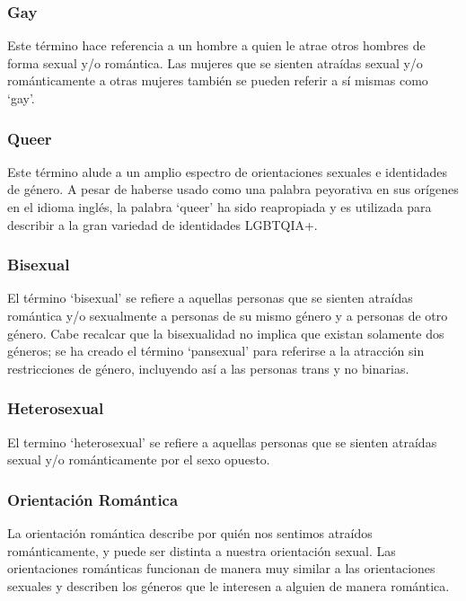 \documentclass[12pt,openany]{book}
\begin{document}
\subsubsection*{Gay}

Este término hace referencia a un hombre a quien le atrae otros hombres de forma sexual y/o romántica. Las mujeres que se sienten atraídas sexual y/o románticamente a otras mujeres también se pueden referir a sí mismas como `gay'.

\subsubsection*{Queer}

Este término alude a un amplio espectro de orientaciones sexuales e identidades de género. A pesar de haberse usado como una palabra peyorativa en sus orígenes en el idioma inglés, la palabra `queer' ha sido reapropiada y es utilizada para describir a la gran variedad de identidades LGBTQIA+.

\subsubsection*{Bisexual}

El término `bisexual' se refiere a aquellas personas que se sienten atraídas romántica y/o sexualmente a personas de su mismo género y a personas de otro género. Cabe recalcar que la bisexualidad no implica que existan solamente dos géneros; se ha creado el término `pansexual' para referirse a la atracción sin restricciones de género, incluyendo así a las personas trans y no binarias.

\subsubsection*{Heterosexual}

El termino `heterosexual' se refiere a aquellas personas que se sienten atraídas sexual y/o románticamente por el sexo opuesto.

\subsubsection*{Orientación Romántica}

La orientación romántica describe por quién nos sentimos atraídos románticamente, y puede ser distinta a nuestra orientación sexual. Las orientaciones románticas funcionan de manera muy similar a las orientaciones sexuales y describen los géneros que le interesen a alguien de manera romántica.
\end{document}
